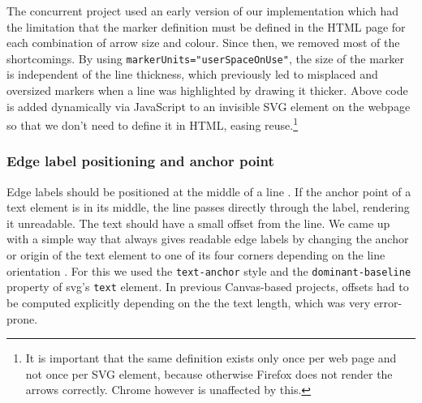 The concurrent project \cite{feil2016idp} used an early version of our implementation which had the limitation that the marker definition must be defined in the HTML page for each combination of arrow size and colour. Since then, we removed most of the shortcomings. By using \texttt{markerUnits="userSpaceOnUse"}, the size of the marker is independent of the line thickness, which previously led to misplaced and oversized markers when a line was highlighted by drawing it thicker. Above code is added dynamically via JavaScript to an invisible SVG element on the webpage so that we don't need to define it in HTML, easing reuse.\footnote{It is important that the same definition exists only once per web page and not once per SVG element, because otherwise Firefox does not render the arrows correctly. Chrome however is unaffected by this.}


\subsubsection{Edge label positioning and anchor point}
Edge labels should be positioned at the middle of a line \cite{feil2016idp}. If the anchor point of a text element is in its middle, the line passes directly through the label, rendering it unreadable. The text should have a small offset from the line. We came up with a simple way that always gives readable edge labels by changing the anchor or origin of the text element to one of its four corners depending on the line orientation . For this we used the \texttt{text-anchor} style and the \texttt{dominant-baseline} property of svg's \texttt{text} element. In previous Canvas-based projects, offsets had to be computed explicitly depending on the  the text length, which was very error-prone.

 

